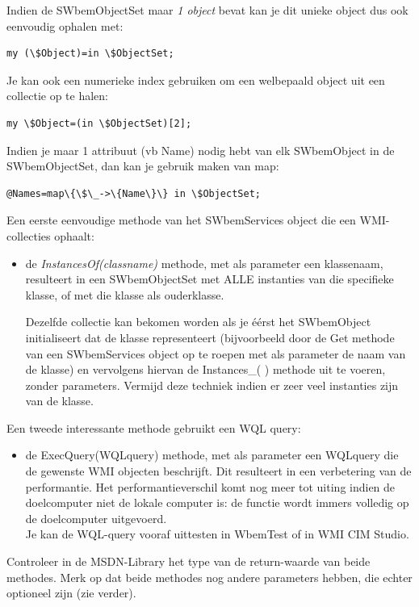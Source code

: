 \documentclass[11pt,a4paper]{report}
\begin{document}
Indien de SWbemObjectSet maar \textit{1 object} bevat kan je dit unieke object dus ook eenvoudig ophalen met:
\begin{lstlisting}
my (\$Object)=in \$ObjectSet;
\end{lstlisting}
Je kan ook een numerieke index gebruiken om een welbepaald object uit een collectie op te halen:
\begin{lstlisting}
my \$Object=(in \$ObjectSet)[2];
\end{lstlisting}
Indien je maar 1 attribuut (vb Name) nodig hebt van elk SWbemObject in de SWbemObjectSet, dan kan je gebruik maken van map:
\begin{lstlisting}
@Names=map\{\$\_->\{Name\}\} in \$ObjectSet;
\end{lstlisting}
Een eerste eenvoudige methode van het SWbemServices object die een WMI-collecties ophaalt:
\begin{itemize}
	\item de \textit{InstancesOf(classname)} methode, met als parameter een klassenaam, resulteert in een SWbemObjectSet met ALLE instanties van die specifieke klasse, of met die klasse als ouderklasse.
	\par Dezelfde collectie kan bekomen worden als je éérst het SWbemObject initialiseert dat de klasse representeert (bijvoorbeeld door de Get methode van een SWbemServices object op te roepen met als parameter de naam van de klasse) en vervolgens hiervan de Instances\_( ) methode uit te voeren, zonder parameters.
	Vermijd deze techniek indien er zeer veel instanties zijn van de klasse.
\end{itemize}
Een tweede interessante methode gebruikt een WQL query:
\begin{itemize}
	\item de ExecQuery(WQLquery) methode, met als parameter een WQLquery die de gewenste WMI objecten beschrijft. Dit resulteert in een verbetering van de performantie. Het performantieverschil komt nog meer tot uiting indien de doelcomputer niet de lokale computer is: de functie wordt immers volledig op de doelcomputer uitgevoerd.
	\\ Je kan de WQL-query vooraf uittesten in WbemTest of in WMI CIM Studio.
\end{itemize}
Controleer in de MSDN-Library het type van de return-waarde van beide methodes. Merk op dat beide methodes nog andere parameters hebben, die echter optioneel zijn (zie verder).
\end{document}
